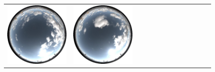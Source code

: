 \begin{figure}[!ht]
\begin{tabular}{@{}rcccccccccccc@{}}
    \includegraphics[width=\customwidth]{./figures/reconstruction/envmaps/20141011_132928.jpg} &
    \includegraphics[width=\customwidth]{./figures/reconstruction/envmaps/20141011_135928.jpg} &

\end{tabular}
\end{figure}
